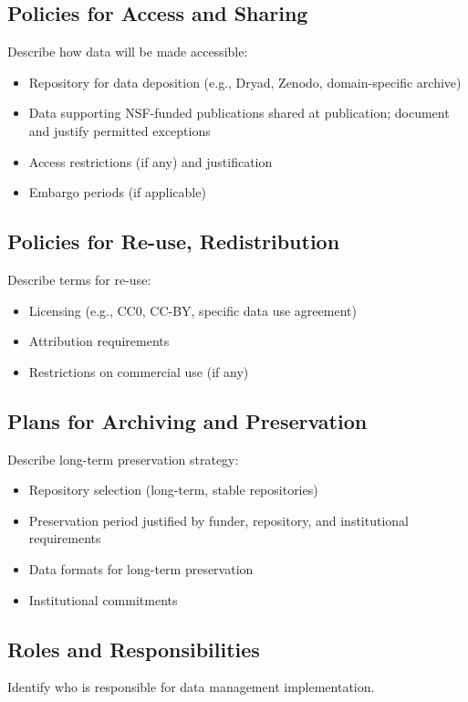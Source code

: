 \documentclass[11pt,letterpaper]{article}
\begin{document}
\subsection*{Policies for Access and Sharing}
Describe how data will be made accessible:
\begin{itemize}
    \item Repository for data deposition (e.g., Dryad, Zenodo, domain-specific archive)
    \item Data supporting NSF-funded publications shared at publication; document and justify permitted exceptions
    \item Access restrictions (if any) and justification
    \item Embargo periods (if applicable)
\end{itemize}

\subsection*{Policies for Re-use, Redistribution}
Describe terms for re-use:
\begin{itemize}
    \item Licensing (e.g., CC0, CC-BY, specific data use agreement)
    \item Attribution requirements
    \item Restrictions on commercial use (if any)
\end{itemize}

\subsection*{Plans for Archiving and Preservation}
Describe long-term preservation strategy:
\begin{itemize}
    \item Repository selection (long-term, stable repositories)
    \item Preservation period justified by funder, repository, and institutional requirements
    \item Data formats for long-term preservation
    \item Institutional commitments
\end{itemize}

\subsection*{Roles and Responsibilities}
Identify who is responsible for data management implementation.
\end{document}
